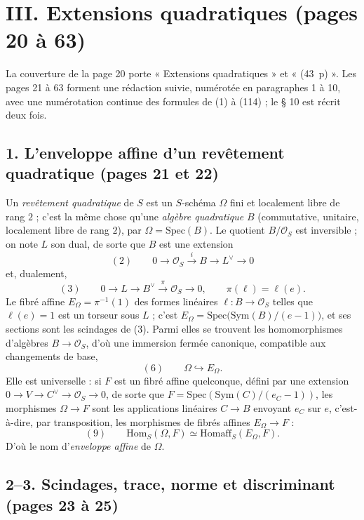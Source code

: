 \documentclass[11pt,a4paper]{article}
\begin{document}
\section*{III. Extensions quadratiques (pages 20 à 63)}

La couverture de la page 20 porte « Extensions quadratiques » et « (43~p) ». Les
pages 21 à 63 forment une rédaction suivie, numérotée en paragraphes 1 à 10, avec
une numérotation continue des formules de (1) à (114) ; le § 10 est récrit deux
fois.

\subsection*{1. L'enveloppe affine d'un revêtement quadratique (pages 21 et 22)}

Un \emph{revêtement quadratique} de $S$ est un $S$-schéma $\Omega$ fini et localement
libre de rang $2$ ; c'est la même chose qu'une \emph{algèbre quadratique} $B$
(commutative, unitaire, localement libre de rang $2$), par $\Omega =
\mathrm{Spec}(B)$. Le quotient $B/\mathcal{O}_S$ est inversible ; on note $L$ son dual,
de sorte que $B$ est une extension
\[
  (2) \qquad 0 \to \mathcal{O}_S \xrightarrow{\ i\ } B \to L^{\vee} \to 0
\]
et, dualement,
\[
  (3) \qquad 0 \to L \to B^{\vee} \xrightarrow{\ \pi\ } \mathcal{O}_S \to 0, \qquad
  \pi(\ell) = \ell(e).
\]
Le fibré affine $E_\Omega = \pi^{-1}(1)$ des formes linéaires $\ell : B \to
\mathcal{O}_S$ telles que $\ell(e) = 1$ est un torseur sous $L$ ; c'est $E_\Omega =
\mathrm{Spec}\bigl(\mathrm{Sym}(B)/(e - 1)\bigr)$, et ses sections sont les
scindages de (3). Parmi elles se trouvent les homomorphismes d'algèbres $B \to
\mathcal{O}_S$, d'où une immersion fermée canonique, compatible aux changements de
base,
\[
  (6) \qquad \Omega \hookrightarrow E_\Omega .
\]
Elle est universelle : si $F$ est un fibré affine quelconque, défini par une
extension $0 \to V \to C^{\vee} \to \mathcal{O}_S \to 0$, de sorte que $F =
\mathrm{Spec}(\mathrm{Sym}(C)/(e_C - 1))$, les morphismes $\Omega \to F$ sont les
applications linéaires $C \to B$ envoyant $e_C$ sur $e$, c'est-à-dire, par
transposition, les morphismes de fibrés affines $E_\Omega \to F$ :
\[
  (9) \qquad \mathrm{Hom}_S(\Omega, F) \simeq \mathrm{Homaff}_S(E_\Omega, F).
\]
D'où le nom d'\emph{enveloppe affine} de $\Omega$.

\subsection*{2--3. Scindages, trace, norme et discriminant (pages 23 à 25)}
\end{document}

